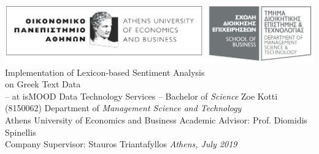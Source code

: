 \documentclass[dvips, letterpaper, 12pt]{report}
\begin{document}
\sloppy


\thesistitle
    {\includegraphics[width=\textwidth]{aueb_logo.eps}}
	{Implementation of Lexicon-based Sentiment Analysis \\
	\vspace{3mm}
	 on Greek Text Data \\
	\vspace{1cm}
	 -- at isMOOD Data Technology Services --}
    {Bachelor of \emph{Science}}
	{Zoe Kotti}
	{(8150062)}
	{Department of \emph{Management Science and Technology} \\
     Athens University of Economics and Business}
	{Academic Advisor: Prof. Diomidis Spinellis \\
     Company Supervisor: Stauros Triantafyllos}
    {\emph{Athens, July 2019}}




\tableofcontents






% 











\appendix

\end{document}
